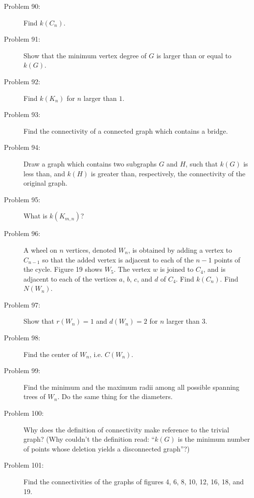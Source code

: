 \documentclass{article}
\begin{document}
\begin{description}

\item[Problem 90:] Find $k(C_n)$.

\item[Problem 91:] Show that the minimum vertex degree of $G$ is larger than or equal to $k(G)$.

\item[Problem 92:] Find $k(K_n)$ for $n$ larger than $1$.

\item[Problem 93:] Find the connectivity of a connected graph which contains a bridge.

\item[Problem 94:] Draw a graph which contains two subgraphs $G$ and $H$, such that $k(G)$ is less than, and $k(H)$ is greater than, respectively, the connectivity of the original graph.

\item[Problem 95:] What is $k(K_{m,n})$?

\item[Problem 96:] A wheel on $n$ vertices, denoted $W_n$, is obtained by adding a vertex to $C_{n-1}$ so that the added vertex is adjacent to each of the $n-1$ points of the cycle. Figure 19 shows $W_5$. The vertex $w$ is joined to $C_4$, and is adjacent to each of the vertices $a$, $b$, $c$, and $d$ of $C_4$. Find $k(C_n)$. Find $N(W_n)$.

\item[Problem 97:] Show that $r(W_n)=1$ and $d(W_n)=2$ for $n$ larger than $3$.

\item[Problem 98:] Find the center of $W_n$, i.e. $C(W_n)$.

\item[Problem 99:] Find the minimum and the maximum radii among all possible spanning trees of $W_n$. Do the same thing for the diameters.

\item[Problem 100:] Why does the definition of connectivity make reference to the trivial graph? (Why couldn't the definition read: ``$k(G)$ is the minimum number of points whose deletion yields a disconnected graph''?)

\item[Problem 101:] Find the connectivities of the graphs of figures 4, 6, 8, 10, 12, 16, 18, and 19.

\end{description}
\end{document}
